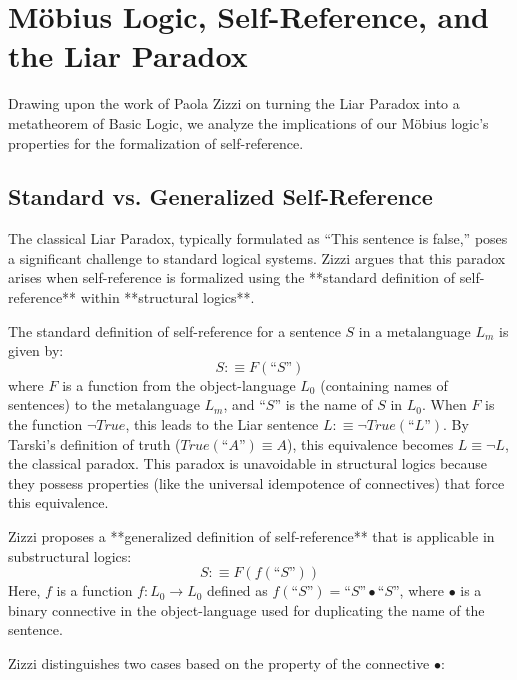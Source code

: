 	\section{Möbius Logic, Self-Reference, and the Liar Paradox}
	
	Drawing upon the work of Paola Zizzi on turning the Liar Paradox into a metatheorem of Basic Logic, we analyze the implications of our M\"{o}bius logic's properties for the formalization of self-reference.
	
	\subsection{Standard vs. Generalized Self-Reference}
	
	The classical Liar Paradox, typically formulated as ``This sentence is false,'' poses a significant challenge to standard logical systems. Zizzi argues that this paradox arises when self-reference is formalized using the **standard definition of self-reference** within **structural logics**.
	
	The standard definition of self-reference for a sentence \(S\) in a metalanguage \(L_m\) is given by:
	\[ S :\equiv F(\text{``}S\text{''}) \]
	where \(F\) is a function from the object-language \(L_0\) (containing names of sentences) to the metalanguage \(L_m\), and \(\text{``}S\text{''}\) is the name of \(S\) in \(L_0\). When \(F\) is the function \(\neg True\), this leads to the Liar sentence \(L :\equiv \neg True(\text{``}L\text{''})\). By Tarski's definition of truth (\(True(\text{``}A\text{''}) \equiv A\)), this equivalence becomes \(L \equiv \neg L\), the classical paradox. This paradox is unavoidable in structural logics because they possess properties (like the universal idempotence of connectives) that force this equivalence.
	
	Zizzi proposes a **generalized definition of self-reference** that is applicable in substructural logics:
	\[ S :\equiv F(f(\text{``}S\text{''})) \]
	Here, \(f\) is a function \(f: L_0 \to L_0\) defined as \(f(\text{``}S\text{''}) = \text{``}S\text{''} \bullet \text{``}S\text{''}\), where \(\bullet\) is a binary connective in the object-language used for duplicating the name of the sentence.
	
	Zizzi distinguishes two cases based on the property of the connective \(\bullet\):
	

